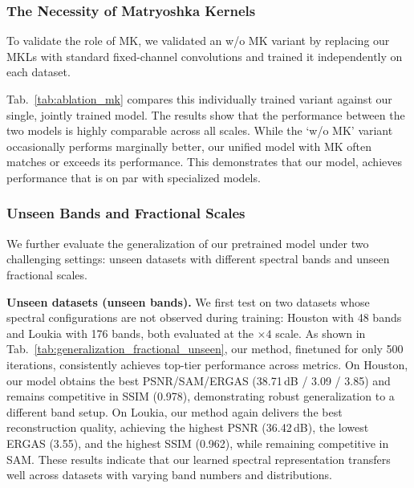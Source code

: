 \subsubsection{The Necessity of Matryoshka Kernels}
\label{ablation:necess-nk}
To validate the role of MK, we validated an w/o MK variant by replacing our MKLs with standard fixed-channel convolutions and trained it independently on each dataset.

Tab.~\ref{tab:ablation_mk} compares this individually trained variant against our single, jointly trained model. The results show that the performance between the two models is highly comparable across all scales. While the `w/o MK' variant occasionally performs marginally better, our unified model with MK often matches or exceeds its performance.
This demonstrates that our model, achieves performance that is on par with specialized models. \\
\subsubsection{Unseen Bands and Fractional Scales}
\label{sec:generalization}
We further evaluate the generalization of our pretrained model under two challenging settings: unseen datasets with different spectral bands and unseen fractional scales.

\textbf{Unseen datasets (unseen bands).}
We first test on two datasets whose spectral configurations are not observed during training: Houston with 48 bands and Loukia with 176 bands, both evaluated at the $\times4$ scale.
As shown in Tab.~\ref{tab:generalization_fractional_unseen}, our method, finetuned for only 500 iterations, consistently achieves top-tier performance across metrics.
On Houston, our model obtains the best PSNR/SAM/ERGAS (38.71\,dB / 3.09 / 3.85) and remains competitive in SSIM (0.978), demonstrating robust generalization to a different band setup.
On Loukia, our method again delivers the best reconstruction quality, achieving the highest PSNR (36.42\,dB), the lowest ERGAS (3.55), and the highest SSIM (0.962), while remaining competitive in SAM.
These results indicate that our learned spectral representation transfers well across datasets with varying band numbers and distributions.

